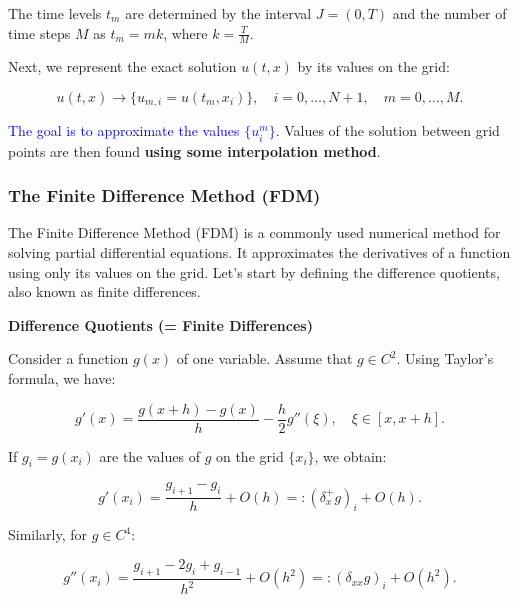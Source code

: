 The time levels $t_m$ are determined by the interval $J = (0, T)$ and the number of time steps $M$ as $t_m = mk$, where $k = \frac{T}{M}$.

\medskip

Next, we represent the exact solution $u(t, x)$ by its values on the grid:

\begin{equation*}
u(t, x) \rightarrow \{u_{m,i} = u(t_m, x_i)\}, \quad i = 0, \ldots, N+1, \quad m = 0, \ldots, M.
\end{equation*}

\textcolor{blue}{The goal is to approximate the values $\{u^{m}_{i}\}$}. Values of the solution between grid points are then found \textbf{using some interpolation method}.

\subsubsection{The Finite Difference Method (FDM)}

The Finite Difference Method (FDM) is a commonly used numerical method for solving partial differential equations. It approximates the derivatives of a function using only its values on the grid. Let's start by defining the difference quotients, also known as finite differences.

\textbf{Difference Quotients (= Finite Differences)}

Consider a function $g(x)$ of one variable. Assume that $g \in C^2$. Using Taylor's formula, we have:

\begin{equation*}
g' (x) = \frac{g(x + h) - g(x)}{h} - \frac{h}{2} g''(\xi), \quad \xi \in [x, x + h].
\end{equation*}

If $g_i = g(x_i)$ are the values of $g$ on the grid $\{x_i\}$, we obtain:

\begin{equation*}
g' (x_i) = \frac{g_{i+1} - g_i}{h} + O(h) =: {(\delta^{+}_{x} g)}_i + O(h).
\end{equation*}

Similarly, for $g \in C^4$:

\begin{equation*}
g'' (x_i) = \frac{g_{i+1} - 2g_i + g_{i-1}}{h^2} + O(h^2) =: {(\delta_{xx}g)}_i + O(h^2).
\end{equation*}

